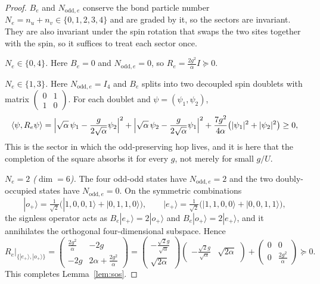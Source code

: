 \documentclass[11pt]{article}
\theoremstyle{plain}
\theoremstyle{definition}
\begin{document}
\begin{proof}
$B_e$ and $N_{\mathrm{odd},e}$ conserve the bond particle number
$N_e=n_u+n_v\in\{0,1,2,3,4\}$ and are graded by it, so the sectors are invariant.
They are also invariant under the spin rotation that swaps the two sites together
with the spin, so it suffices to treat each sector once.

\emph{$N_e\in\{0,4\}$.} Here $B_e=0$ and $N_{\mathrm{odd},e}=0$, so
$R_e=\frac{2g^2}{\alpha}I\succeq0$.

\emph{$N_e\in\{1,3\}$.} Here $N_{\mathrm{odd},e}=I_4$ and $B_e$ splits into two
decoupled spin doublets with matrix $\begin{pmatrix}0&1\\1&0\end{pmatrix}$. For each
doublet and $\psi=(\psi_1,\psi_2)$,
\[
 \langle\psi,R_e\psi\rangle
 =\Bigl|\sqrt\alpha\,\psi_1-\frac{g}{2\sqrt\alpha}\psi_2\Bigr|^2
 +\Bigl|\sqrt\alpha\,\psi_2-\frac{g}{2\sqrt\alpha}\psi_1\Bigr|^2
 +\frac{7g^2}{4\alpha}\bigl(|\psi_1|^2+|\psi_2|^2\bigr)\ge0 ,
\]
This is the sector in which the odd-preserving hop lives, and it is here that the
completion of the square absorbs it for every $g$, not merely for small $g/U$.

\emph{$N_e=2$ ($\dim=6$).} The four odd-odd states have $N_{\mathrm{odd},e}=2$ and
the two doubly-occupied states have $N_{\mathrm{odd},e}=0$. On the symmetric
combinations
\[
 |o_+\rangle=\tfrac1{\sqrt2}\bigl(|1,0,0,1\rangle+|0,1,1,0\rangle\bigr),\qquad
 |e_+\rangle=\tfrac1{\sqrt2}\bigl(|1,1,0,0\rangle+|0,0,1,1\rangle\bigr),
\]
the signless operator acts as $B_e|e_+\rangle=2|o_+\rangle$ and
$B_e|o_+\rangle=2|e_+\rangle$, and it annihilates the orthogonal four-dimensional
subspace. Hence
\[
 R_e\big|_{\{|e_+\rangle,|o_+\rangle\}}
 =\begin{pmatrix}\frac{2g^2}{\alpha}&-2g\\-2g&2\alpha+\frac{2g^2}{\alpha}\end{pmatrix}
 =\begin{pmatrix}-\frac{\sqrt2 g}{\sqrt\alpha}\\ \sqrt{2\alpha}\end{pmatrix}
  \begin{pmatrix}-\frac{\sqrt2 g}{\sqrt\alpha}&\sqrt{2\alpha}\end{pmatrix}
 +\begin{pmatrix}0&0\\0&\frac{2g^2}{\alpha}\end{pmatrix}\succeq0 .
\]
This completes Lemma~\ref{lem:sos}.
\end{proof}
\end{document}
